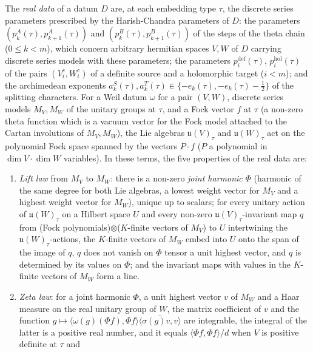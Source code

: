 \begin{definition}\label{pf:sh-siegel:archdef}
The \emph{real data} of a datum $D$ are, at each embedding type $\tau$, the discrete series parameters prescribed by the
Harish-Chandra parameters of $D$: the parameters $(p^A_k(\tau),p^A_{k+1}(\tau))$ and $(p^B_k(\tau),p^B_{k+1}(\tau))$ of the
steps of the theta chain ($0\le k<m$), which concern arbitrary hermitian spaces $V,W$ of $D$ carrying discrete series models
with these parameters; the parameters $p^{\mathrm{def}}_i(\tau)$, $p^{\mathrm{hol}}_i(\tau)$ of the pairs $(V^c_i,W^c_i)$ of a
definite source and a holomorphic target ($i<m$); and the archimedean exponents $a^S_k(\tau),a^T_k(\tau)\in\{-e_k(\tau),
-e_k(\tau)-\frac12\}$ of the splitting characters. For a Weil datum $\omega$ for a pair $(V,W)$, discrete series models
$M_V,M_W$ of the unitary groups at $\tau$, and a Fock vector $f$ at $\tau$ (a non-zero theta function which is a vacuum
vector for the Fock model attached to the Cartan involutions of $M_V,M_W$), the Lie algebras $\mathfrak u(V)_\tau$ and
$\mathfrak u(W)_\tau$ act on the polynomial Fock space spanned by the vectors $P\cdot f$ ($P$ a polynomial in
$\dim V\cdot\dim W$ variables). In these terms, the five properties of the real data are:
\begin{enumerate}[label=(\alph*)]
\item\label{pf:sh-siegel:arch:lift} \emph{Lift law} from $M_V$ to $M_W$: there is a non-zero \emph{joint harmonic}
$\Phi$ (harmonic of the same degree for both Lie algebras, a lowest weight vector for $M_V$ and a highest weight vector for
$M_W$), unique up to scalars; for every unitary action of $\mathfrak u(W)_\tau$ on a Hilbert space $U$ and every non-zero
$\mathfrak u(V)_\tau$-invariant map $q$ from (Fock polynomials)$\otimes$($K$-finite vectors of $M_V$) to $U$ intertwining
the $\mathfrak u(W)_\tau$-actions, the $K$-finite vectors of $M_W$ embed into $U$ onto the span of the image of $q$, $q$ does
not vanish on $\Phi$ tensor a unit highest vector, and $q$ is determined by its values on $\Phi$; and the invariant maps
with values in the $K$-finite vectors of $M_W$ form a line.
\item\label{pf:sh-siegel:arch:zeta} \emph{Zeta law}: for a joint harmonic $\Phi$, a unit highest vector $v$ of $M_W$ and a
Haar measure on the real unitary group of $W$, the matrix coefficient of $v$ and the function
$g\mapsto\langle\omega(g)(\Phi f),\Phi f\rangle\overline{\langle\sigma(g)v,v\rangle}$ are integrable, the integral of the
latter is a positive real number, and it equals $\langle\Phi f,\Phi f\rangle/d$ when $V$ is positive definite at $\tau$ and

\end{enumerate}
\end{definition}
